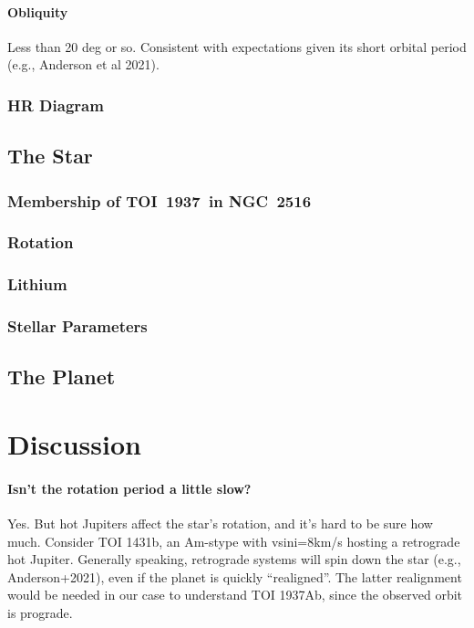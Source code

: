 \documentclass[12pt,twocolumn,tighten]{aastex63}
\newcommand{\tn}{TOI~1937} %
\newcommand{\cn}{NGC~2516} %
\begin{document}
\paragraph{Obliquity} Less than 20 deg or so. Consistent with
expectations given its short orbital period (e.g., Anderson et al
2021). 

\subsubsection{HR Diagram}
\label{subsec:hr}

\subsection{The Star}
\label{subsec:star}

\subsubsection{Membership of \tn\ in \cn}
\label{subsec:member}

\subsubsection{Rotation}

\subsubsection{Lithium}

\subsubsection{Stellar Parameters}
\label{subsec:starparams}

\subsection{The Planet}
\label{subsec:planet}


\section{Discussion}
\label{sec:discussion}

\paragraph{Isn't the rotation period a little slow?}
Yes. But hot Jupiters affect the star's rotation, and it's hard to be
sure how much. Consider TOI 1431b, an Am-stype with vsini=8km/s
hosting a retrograde hot Jupiter. 
Generally speaking, retrograde systems will spin down the star (e.g.,
Anderson+2021), even if the planet is quickly ``realigned''.
The latter realignment would be needed in our case to understand TOI
1937Ab, since the observed orbit is prograde.
\end{document}

